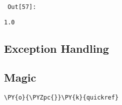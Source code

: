 \par\vspace{1\smallerfontscale}%
    
        {\par%
        \vspace{-1\smallerfontscale}%
        \noindent%
        \begin{minipage}{\cellleftmargin}%
    \hfill%
    {\smaller%
    \tt%
    \color{nbframe-out-prompt}%
    Out[57]:}%
    \hspace{\inputpadding}%
    \hspace{0em}%
    \hspace{3pt}%
    \end{minipage}%
        }%
    \begin{addmargin}[\cellleftmargin]{0em}%
    {\smaller%
    \vspace{-1\smallerfontscale}%
    
    
    
    \begin{verbatim}
1.0
    \end{verbatim}

    
}%
    \end{addmargin}%

    \subsection{Exception Handling}



    \subsection{Magic}



{\par%
\vspace{-1\baselineskip}%
}%
\begin{notebookcell}[58]%
\begin{addmargin}[\cellleftmargin]{0em}%
{\smaller%
\par%
%
\vspace{-1\smallerfontscale}%
\begin{Verbatim}[commandchars=\\\{\}]
\PY{o}{\PYZpc{}}\PY{k}{quickref}
\end{Verbatim}
%
\par%
\vspace{-1\smallerfontscale}}%
\end{addmargin}
\end{notebookcell}


